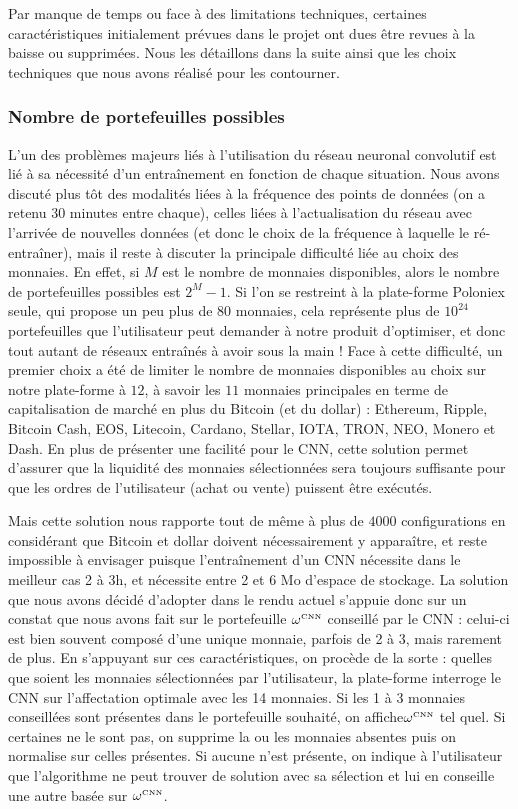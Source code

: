 \documentclass[a4paper, 10pt]{article}
\begin{document}
Par manque de temps ou face à des limitations techniques, certaines caractéristiques initialement prévues dans le projet ont dues être revues à la baisse ou supprimées. Nous les détaillons dans la suite ainsi que les choix techniques que nous avons réalisé pour les contourner.

\subsubsection{Nombre de portefeuilles possibles}
\label{sec:developpement_limites_portfolio}

L'un des problèmes majeurs liés à l'utilisation du réseau neuronal convolutif est lié à sa nécessité d'un entraînement en fonction de chaque situation. Nous avons discuté plus tôt des modalités liées à la fréquence des points de données (on a retenu 30 minutes entre chaque), celles liées à l'actualisation du réseau avec l'arrivée de nouvelles données (et donc le choix de la fréquence à laquelle le ré-entraîner), mais il reste à discuter la principale difficulté liée au choix des monnaies. En effet, si $M$ est le nombre de monnaies disponibles, alors le nombre de portefeuilles possibles est $2^M - 1$. Si l'on se restreint à la plate-forme Poloniex seule, qui propose un peu plus de 80 monnaies, cela représente plus de $10^{24}$ portefeuilles que l'utilisateur peut demander à notre produit d'optimiser, et donc tout autant de réseaux entraînés à avoir sous la main ! Face à cette difficulté, un premier choix a été de limiter le nombre de monnaies disponibles au choix sur notre plate-forme à $12$, à savoir les $11$ monnaies principales en terme de capitalisation de marché en plus du Bitcoin (et du dollar) : Ethereum, Ripple, Bitcoin Cash, EOS, Litecoin, Cardano, Stellar, IOTA, TRON, NEO, Monero et Dash. En plus de présenter une facilité pour le CNN, cette solution permet d'assurer que la liquidité des monnaies sélectionnées sera toujours suffisante pour que les ordres de l'utilisateur (achat ou vente) puissent être exécutés.

Mais cette solution nous rapporte tout de même à plus de $4000$ configurations en considérant que Bitcoin et dollar doivent nécessairement y apparaître, et reste impossible à envisager puisque l'entraînement d'un CNN nécessite dans le meilleur cas 2 à 3h, et nécessite entre 2 et 6 Mo d'espace de stockage. La solution que nous avons décidé d'adopter dans le rendu actuel s'appuie donc sur un constat que nous avons fait sur le portefeuille $\omega^{\text{\tiny CNN}}$ conseillé par le CNN : celui-ci est bien souvent composé d'une unique monnaie, parfois de 2 à 3, mais rarement de plus. En s'appuyant sur ces caractéristiques, on procède de la sorte : quelles que soient les monnaies sélectionnées par l'utilisateur, la plate-forme interroge le CNN sur l'affectation optimale avec les 14 monnaies. Si les 1 à 3 monnaies conseillées sont présentes dans le portefeuille souhaité, on affiche$\omega^{\text{\tiny CNN}}$ tel quel. Si certaines ne le sont pas, on supprime la ou les monnaies absentes puis on normalise sur celles présentes. Si aucune n'est présente, on indique à l'utilisateur que l'algorithme ne peut trouver de solution avec sa sélection et lui en conseille une autre basée sur $\omega^{\text{\tiny CNN}}$.
\end{document}

